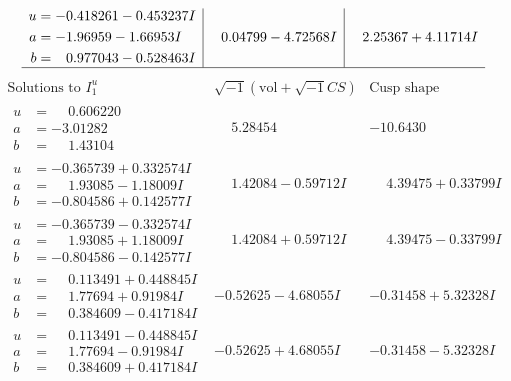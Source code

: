 \documentclass[1p]{elsarticle_modified}
\theoremstyle{definition}
\newcommand{\I}{\sqrt{-1}}
\begin{document}
$$\begin{array}{c|c|c}
\begin{aligned}
u &= -0.418261 - 0.453237 I \\
a &= -1.96959 - 1.66953 I \\
b &= \phantom{-}0.977043 - 0.528463 I\end{aligned}
 & \phantom{-}0.04799 - 4.72568 I & \phantom{-}2.25367 + 4.11714 I\\
 \hline 
 \end{array}$$\newpage$$\begin{array}{c|c|c}  
\text{Solutions to }I^u_{1}& \I (\text{vol} + \sqrt{-1}CS) & \text{Cusp shape}\\
 \hline 
\begin{aligned}
u &= \phantom{-}0.606220\phantom{ +0.000000I} \\
a &= -3.01282\phantom{ +0.000000I} \\
b &= \phantom{-}1.43104\phantom{ +0.000000I}\end{aligned}
 & \phantom{-}5.28454\phantom{ +0.000000I} & -10.6430\phantom{ +0.000000I} \\ \hline\begin{aligned}
u &= -0.365739 + 0.332574 I \\
a &= \phantom{-}1.93085 - 1.18009 I \\
b &= -0.804586 + 0.142577 I\end{aligned}
 & \phantom{-}1.42084 - 0.59712 I & \phantom{-}4.39475 + 0.33799 I \\ \hline\begin{aligned}
u &= -0.365739 - 0.332574 I \\
a &= \phantom{-}1.93085 + 1.18009 I \\
b &= -0.804586 - 0.142577 I\end{aligned}
 & \phantom{-}1.42084 + 0.59712 I & \phantom{-}4.39475 - 0.33799 I \\ \hline\begin{aligned}
u &= \phantom{-}0.113491 + 0.448845 I \\
a &= \phantom{-}1.77694 + 0.91984 I \\
b &= \phantom{-}0.384609 - 0.417184 I\end{aligned}
 & -0.52625 - 4.68055 I & -0.31458 + 5.32328 I \\ \hline\begin{aligned}
u &= \phantom{-}0.113491 - 0.448845 I \\
a &= \phantom{-}1.77694 - 0.91984 I \\
b &= \phantom{-}0.384609 + 0.417184 I\end{aligned}
 & -0.52625 + 4.68055 I & -0.31458 - 5.32328 I \\ \hline\begin{aligned}

\end{aligned}
\end{array}$$
\end{document}
